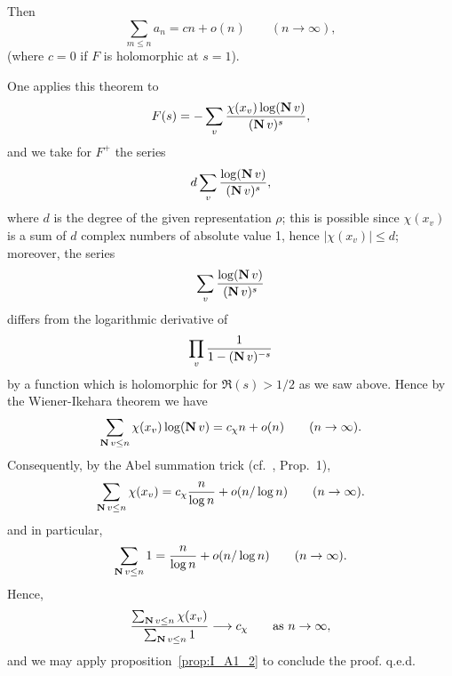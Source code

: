 \begin{subappendices}
\begin{thm}
	Then
	\[
		\sum_{m\le n} a_n = cn + o(n) \qquad (n \to \infty),
	\]
	(where $c = 0$ if $F$ is holomorphic at $s = 1$).
\end{thm}
One applies this theorem to
\[
	F(s) = -\sum_{v} \frac{\chi(x_v) \log(\operatorname{\mathbf{N}} v)}{(\operatorname{\mathbf{N}} v)^s},
\]
and we take for $F^+$ the series
\[
	d \sum_{v} \frac{\log(\operatorname{\mathbf{N}} v)}{(\operatorname{\mathbf{N}} v)^s},
\]
where $d$ is the degree of the given representation $\rho$; this is possible
\dpage
since $\chi(x_v)$ is a sum of $d$ complex numbers of absolute value 1,
hence $|\chi(x_v)| \le d$; moreover, the series
\[
	\sum_{v} \frac{\log(\operatorname{\mathbf{N}} v)}{(\operatorname{\mathbf{N}} v)^s}
\]
differs from the logarithmic derivative of
\[
	\prod_{v} \frac{1}{1 - (\operatorname{\mathbf{N}} v)^{-s}}
\]
by a function which is holomorphic for $\Re(s) > 1/2$ as we saw above.
Hence by the Wiener-Ikehara theorem we have
\[
	\sum_{\operatorname{\mathbf{N}} v \le n} \chi(x_v) \log(\operatorname{\mathbf{N}} v) = c_\chi n + o(n)
	\qquad (n \to \infty).
\]
Consequently, by the Abel summation trick (cf.\ \cite[124]{13}, Prop.~1),
\[
	\sum_{\operatorname{\mathbf{N}} v \le n} \chi(x_v) = c_\chi \frac{n}{\log n} + o(n/\log
	n) \qquad (n \to \infty).
\]
and in particular,
\[
	\sum_{\operatorname{\mathbf{N}} v \le n} 1 = \frac{n}{\log n} + o(n/\log n) \qquad (n
	\to \infty).
\]
Hence,
\[
	\frac{ \sum_{\operatorname{\mathbf{N}} v \le n} \chi(x_v) }{ \sum_{\operatorname{\mathbf{N}} v \le n} 1 }
	\longrightarrow c_\chi \qquad \text{as } n\to \infty,
\]
and we may apply proposition~\ref{prop:I_A1_2} to conclude the proof.
\hfill
q.e.d.

\end{subappendices}
